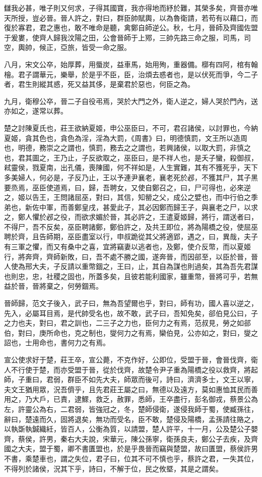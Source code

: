 \begin{pinyinscope}
讎我必甚，唯子則又何求，子得其國寶，我亦得地而紓於難，其榮多矣，齊晉亦唯天所授，豈必晉。晉人許之，對曰，群臣帥賦輿，以為魯衛請，若苟有以藉口，而復於寡君，君之惠也，敢不唯命是聽，禽鄭自師逆公。秋，七月，晉師及齊國佐盟于爰婁，使齊人歸我汶陽之田，公會晉師于上鄍，三帥先路三命之服，司馬，司空，輿帥，候正，亞旅，皆受一命之服。

八月，宋文公卒，始厚葬，用蜃炭，益車馬，始用殉，重器備。槨有四阿，棺有翰檜。君子謂華元，樂舉，於是乎不臣，臣，治煩去惑者也，是以伏死而爭，今二子者，君生則縱其惑，死又益其侈，是棄君於惡也，何臣之為。

九月，衛穆公卒，晉二子自役弔焉，哭於大門之外，衛人逆之，婦人哭於門內，送亦如之，遂常以葬。

楚之討陳夏氏也，莊王欲納夏姬，申公巫臣曰，不可，君召諸侯，以討罪也，今納夏姬，貪其色也，貪色為淫，淫為大罰，《周書》曰，明德慎罰，文王所以造周也，明德，務崇之之謂也，慎罰，務去之之謂也，若興諸侯，以取大罰，非慎之也，君其圖之，王乃止，子反欲取之，巫臣曰，是不祥人也，是夭子蠻，殺御叔，弒靈侯，戮夏南，出孔儀，喪陳國，何不祥如是，人生實難，其有不獲死乎，天下多美婦人，何必是，子反乃止，王以予連尹襄老，襄老死於邲，不獲其尸，其子黑要烝焉，巫臣使道焉，曰，歸，吾聘女，又使自鄭召之，曰，尸可得也，必來逆之，姬以告王，王問諸屈巫，對曰，其信，知罃之父，成公之嬖也，而中行伯之季弟也，新佐中軍，而善鄭皇戌，甚愛此子，其必因鄭而歸王子，與襄老之尸，以求之，鄭人懼於邲之役，而欲求媚於晉，其必許之，王遣夏姬歸，將行，謂送者曰，不得尸，吾不反矣，巫臣聘諸鄭，鄭伯許之，及共王即位，將為陽橋之役，使屈巫聘於齊，且告師期，巫臣盡室以行，申叔跪從其父將適郢，遇之，曰，異哉，夫子有三軍之懼，而又有桑中之喜，宜將竊妻以逃者也，及鄭，使介反幣，而以夏姬行，將奔齊，齊師新敗，曰，吾不處不勝之國，遂奔晉，而因郤至，以臣於晉，晉人使為邢大夫，子反請以重幣錮之，王曰，止，其自為謀也則過矣，其為吾先君謀也則忠，忠，社稷之固也，所蓋多矣，且彼若能利國家，雖重幣，晉將可乎，若無益於晉，晉將棄之，何勞錮焉。

晉師歸，范文子後入，武子曰，無為吾望爾也乎，對曰，師有功，國人喜以逆之，先入，必屬耳目焉，是代帥受名也，故不敢，武子曰，吾知免矣，郤伯見公曰，子之力也夫，對曰，君之訓也，二三子之力也，臣何力之有焉，范叔見，勞之如郤伯，對曰，庚所命也，克之制也，燮何力之有焉，欒伯見，公亦如之，對曰，燮之詔也，士用命也，書何力之有焉。

宣公使求好于楚，莊王卒，宣公薨，不克作好，公即位，受盟于晉，會晉伐齊，衛人不行使于楚，而亦受盟于晉，從於伐齊，故楚令尹子重為陽橋之役以救齊，將起師，子重曰，君弱，群臣不如先大夫，師眾而後可，詩曰，濟濟多士，文王以寧，夫文王猶用眾，況吾儕乎，且先君莊王屬之曰，無德以及遠方，莫如惠恤其民而善用之，乃大戶，已責，逮鰥，救乏，赦罪，悉師，王卒盡行，彭名御戎，蔡景公為左，許靈公為右，二君弱，皆強冠之，冬，楚師侵衛，遂侵我師于蜀，使臧孫往，辭曰，楚遠而久，固將退矣，無功而受名，臣不敢，楚侵及陽橋，孟孫請往賂之，以執斲執鍼織紝，皆百人，公衡為質，以請盟，楚人許平，十一月，公及楚公子嬰齊，蔡侯，許男，秦右大夫說，宋華元，陳公孫寧，衛孫良夫，鄭公子去疾，及齊國之大夫，盟于蜀，卿不書匱盟也，於是乎畏晉而竊與楚盟，故曰匱盟，蔡侯許男不書，乘楚車也，謂之失位，君子曰，位其不可不慎也乎，蔡許之君，一失其位，不得列於諸侯，況其下乎，詩曰，不解于位，民之攸塈，其是之謂矣。


\end{pinyinscope}

